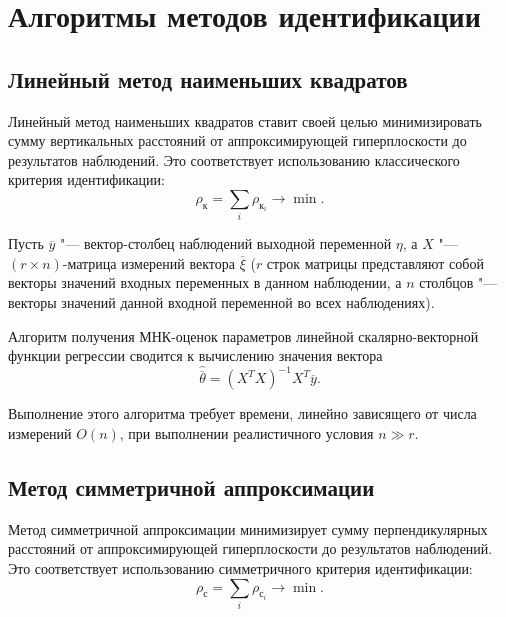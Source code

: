 \section{Алгоритмы методов идентификации}

\subsection{Линейный метод наименьших квадратов}

Линейный метод наименьших квадратов ставит своей целью минимизировать сумму
вертикальных расстояний от аппроксимирующей гиперплоскости до результатов наблюдений.
Это соответствует использованию классического критерия идентификации:
\begin{equation*}
  \rho_{\text{к}} = \sum_i \rho_{\text{к}_i} \rightarrow \min.
\end{equation*}

Пусть \( \overline{y} \) "--- вектор-столбец наблюдений выходной переменной \( \eta \),
а \( X \) "--- \( (r \times n) \)-матрица измерений вектора \( \overline{\xi} \)
(\( r \) строк матрицы представляют собой векторы значений входных переменных в данном наблюдении,
а \( n \) столбцов "--- векторы значений данной входной переменной во всех наблюдениях).

Алгоритм получения МНК-оценок параметров линейной скалярно-векторной функции регрессии сводится
к вычислению значения вектора~\cite{wiki_lse}
\begin{equation*}
  \hat{\overline{\theta}} = (X^{T}X)^{-1}X^{T} \overline{y}.
\end{equation*}

Выполнение этого алгоритма требует времени, линейно зависящего от числа измерений \( O(n) \),
при выполнении реалистичного условия \( n \gg r \).

\vspace{2\baselineskip}
\subsection{Метод симметричной аппроксимации}

Метод симметричной аппроксимации минимизирует сумму перпендикулярных расстояний
от аппроксимирующей гиперплоскости до результатов наблюдений.
Это соответствует использованию симметричного критерия идентификации:
\begin{equation*}
  \rho_{\text{с}} = \sum_i \rho_{\text{с}_i} \rightarrow \min.
\end{equation*}

